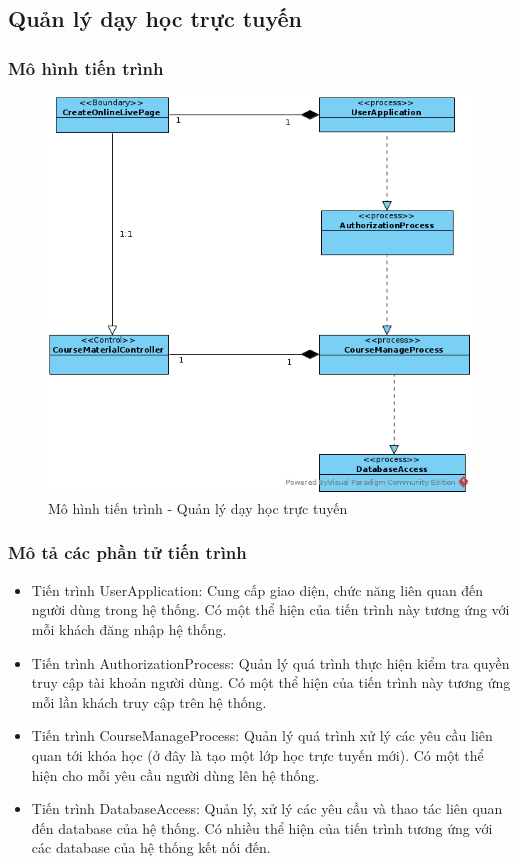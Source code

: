 \documentclass[./../main.tex]{subfiles}
\begin{document}
\subsection{Quản lý dạy học trực tuyến}

\subsubsection{Mô hình tiến trình}

\begin{figure}[H]
	\centering
	\includegraphics[width=\linewidth]{./images/pv_create_online_live.png}
\caption{Mô hình tiến trình - Quản lý dạy học trực tuyến}

\end{figure}

\subsubsection{Mô tả các phần tử tiến trình}
\begin{itemize}
	\item Tiến trình UserApplication: Cung cấp giao diện, chức năng liên quan đến người dùng trong hệ thống. Có một thể hiện của tiến trình này tương ứng với mỗi khách đăng nhập hệ thống.
	\item Tiến trình AuthorizationProcess: Quản lý quá trình thực hiện kiểm tra quyền truy cập tài khoản người dùng.
	Có một thể hiện của tiến trình này tương ứng mỗi lần khách truy cập trên hệ thống.
\item Tiến trình CourseManageProcess: Quản lý quá trình xử lý các yêu cầu liên quan tới khóa học (ở đây là tạo một lớp học trực tuyến mới).
	Có một thể hiện cho mỗi yêu cầu người dùng lên hệ thống.
	\item Tiến trình DatabaseAccess: Quản lý, xử lý các yêu cầu và thao tác liên quan đến  database của hệ thống. Có nhiều thể hiện của tiến trình tương ứng với các database của hệ thống kết nối đến.
\end{itemize}
\end{document}
